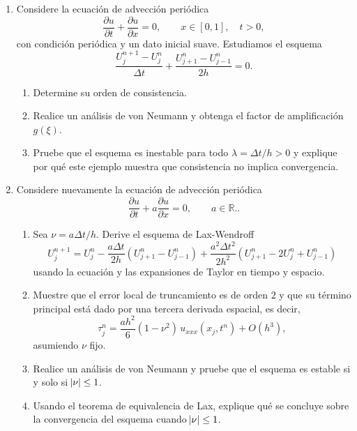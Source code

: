\documentclass[11pt]{article}
\theoremstyle{thmstyle}
\renewcommand{\pd}[2]{\frac{\partial #1}{ \partial #2}}
\def\R{\mathbb R}
\begin{document}
\begin{enumerate}[label=\textbf{\arabic*.}, leftmargin=*]
    \item Considere la ecuaci\'on de advecci\'on peri\'odica
    \[
    \pd{u}{t}+\pd{u}{x}=0, \qquad x\in[0,1], \quad t>0,
    \]
    con condici\'on peri\'odica y un dato inicial suave. Estudiamos el esquema
    \[
    \frac{U_j^{n+1}-U_j^n}{\Delta t} + \frac{U_{j+1}^{n}-U_{j-1}^{n}}{2h}=0.
    \]
    \begin{enumerate}[label=(\alph*)]
        \item Determine su orden de consistencia.
        \item Realice un an\'alisis de von Neumann y obtenga el factor de amplificaci\'on $g(\xi)$.
        \item Pruebe que el esquema es inestable para todo $\lambda=\Delta t/h>0$ y explique por qu\'e este ejemplo muestra que consistencia no implica convergencia.
    \end{enumerate}

    \item Considere nuevamente la ecuaci\'on de advecci\'on peri\'odica
    \[
    \pd{u}{t}+a\pd{u}{x}=0, \qquad a\in\R..
    \]
    \begin{enumerate}[label=(\alph*)]
        \item Sea $\nu=a\Delta t/h$. Derive el esquema de Lax-Wendroff
        \[
        U_j^{n+1}
        =
        U_j^n
        -\frac{a\Delta t}{2h}(U_{j+1}^n-U_{j-1}^n)
        +\frac{a^2\Delta t^2}{2h^2}(U_{j+1}^n-2U_j^n+U_{j-1}^n)
        \]
        usando la ecuación y las expansiones de Taylor en tiempo y espacio. 
        \item Muestre que el error local de truncamiento es de orden $2$ y que su t\'ermino principal est\'a dado por una tercera derivada espacial, es decir,
        \[
        \tau_j^n = \frac{a h^2}{6}(1-\nu^2)\,u_{xxx}(x_j,t^n) + O(h^3),
        \]
        asumiendo $\nu$ fijo.
        \item Realice un an\'alisis de von Neumann y pruebe que el esquema es estable si y solo si $\abs{\nu}\le 1$.
        \item Usando el teorema de equivalencia de Lax, explique qu\'e se concluye sobre la convergencia del esquema cuando $\abs{\nu}\le 1$.
    \end{enumerate}

\end{enumerate}
\end{document}
